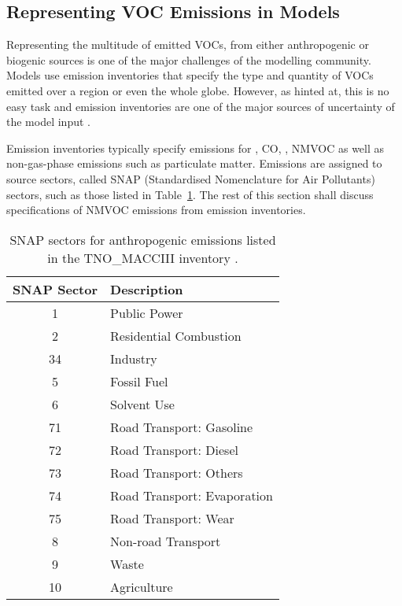 \subsection{Representing VOC Emissions in Models}
Representing the multitude of emitted VOCs, from either anthropogenic or biogenic sources is one of the major challenges of the modelling community.
Models use emission inventories that specify the type and quantity of VOCs emitted over a region or even the whole globe.
However, as hinted at, this is no easy task and emission inventories are one of the major sources of uncertainty of the model input \citep{Russell:2000}.

Emission inventories typically specify emissions for , CO, , NMVOC as well as non-gas-phase emissions such as particulate matter.
Emissions are assigned to source sectors, called SNAP (Standardised Nomenclature for Air Pollutants) sectors, such as those listed in Table~\ref{t:SNAP}.
The rest of this section shall discuss specifications of NMVOC emissions from emission inventories.

\begin{table}
    \centering
    \caption[SNAP sectors in the TNO\_MACCIII]{SNAP sectors for anthropogenic emissions listed in the TNO\_MACCIII inventory \citep{Kuenen:2014}.}
    \begin{tabular}{cl}
        \hline \hline
        \textbf{SNAP Sector} & \textbf{Description} \\
        \hline \hline
        1 & Public Power \\
        2 & Residential Combustion \\
        34 & Industry \\
        5 & Fossil Fuel \\
        6 & Solvent Use \\
        71 & Road Transport: Gasoline \\
        72 & Road Transport: Diesel \\
        73 & Road Transport: Others \\
        74 & Road Transport: Evaporation \\
        75 & Road Transport: Wear \\
        8 & Non-road Transport \\
        9 & Waste \\
        10 & Agriculture \\
        \hline \hline
    \end{tabular}
    \label{t:SNAP}
\end{table}

